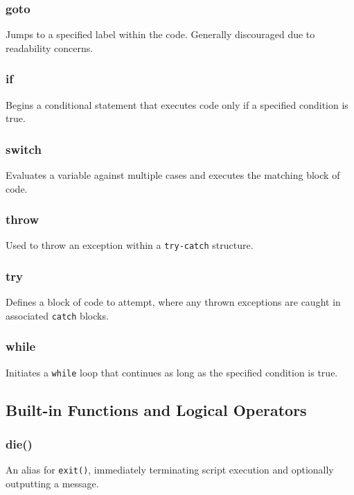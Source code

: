 \documentclass{report}
\begin{document}
\bigbreak \noindent 
\subsubsection{goto}
\bigbreak \noindent 
Jumps to a specified label within the code. Generally discouraged due to readability concerns.

\bigbreak \noindent 
\subsubsection{if}
\bigbreak \noindent 
Begins a conditional statement that executes code only if a specified condition is true.

\bigbreak \noindent 
\subsubsection{switch}
\bigbreak \noindent 
Evaluates a variable against multiple cases and executes the matching block of code.

\bigbreak \noindent 
\subsubsection{throw}
\bigbreak \noindent 
Used to throw an exception within a \texttt{try-catch} structure.

\bigbreak \noindent 
\subsubsection{try}
\bigbreak \noindent 
Defines a block of code to attempt, where any thrown exceptions are caught in associated \texttt{catch} blocks.

\bigbreak \noindent 
\subsubsection{while}
\bigbreak \noindent 
Initiates a \texttt{while} loop that continues as long as the specified condition is true.

\pagebreak
\subsection{Built-in Functions and Logical Operators}
\bigbreak \noindent 
\subsubsection{die()}
\bigbreak \noindent 
An alias for \texttt{exit()}, immediately terminating script execution and optionally outputting a message.
\end{document}
